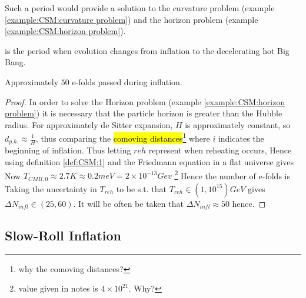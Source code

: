 \documentclass{article}
\begin{document}
Such a period would provide a solution to the curvature problem (example \ref{example:CSM:curvature problem}) and the horizon problem (example \ref{example:CSM:horizon problem}). 

\begin{definition}[Reheating]
 is the period when evolution changes from inflation to the decelerating hot Big Bang. 
\end{definition}

\begin{prop}
Approximately $50$ e-folds passed during inflation. 
\end{prop}
\begin{proof}
In order to solve the Horizon problem (example \ref{example:CSM:horizon problem}) it is necessary that the particle horizon is greater than the Hubble radius. For approximately de Sitter expansion, $H$ is approximately constant, so $d_{p.h.}\approx \frac{1}{H}$, thus comparing the \hl{comoving distances}\footnote{why the comoving distances?} 
where $i$ indicates the beginning of inflation. Thus letting $reh$ represent when reheating occurs, 
Hence using definition \ref{def:CSM:1} and the Friedmann equation in a flat universe 
gives 
Now $T_{CMB,0} \approx 2.7K \approx 0.2 meV = 2 \times 10^{-13} Gev $
\footnote{value given in notes is $4\times 10^{21}$. Why?}
Hence the number of e-folds is 
Taking the uncertainty in $T_{reh}$ to be s.t. that $T_{reh} \in (1,10^{15}) GeV$ gives $\Delta N_{infl} \in (25,60)$. It will be often be taken that $\Delta N_{infl} \approx 50$ hence. 
\end{proof}

\subsection{Slow-Roll Inflation}
\end{document}
